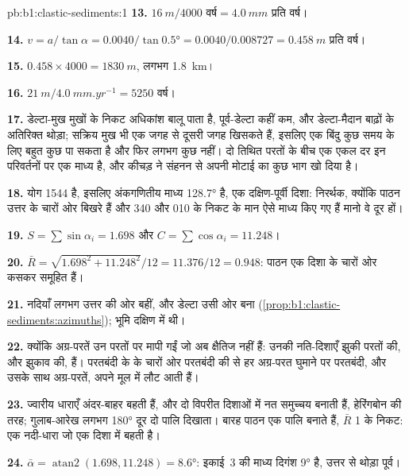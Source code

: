 \begin{solution}{pb:b1:clastic-sediments:1}
\textbf{13.} $\qty{16}{m}/\num{4000}\text{ वर्ष} = \qty{4.0}{mm}$ प्रति वर्ष।

\textbf{14.} $v = a/\tan\alpha = 0.0040/\tan\ang{0.5} = 0.0040/0.008727 =
\qty{0.458}{m}$ प्रति वर्ष।

\textbf{15.} $0.458 \times 4000 = \qty{1830}{m}$, लगभग \qty{1.8}{km}।

\textbf{16.} $\qty{21}{m}/\qty{4.0}{mm.yr^{-1}} = 5250$ वर्ष।

\textbf{17.} डेल्टा-मुख मुखों के निकट अधिकांश बालू पाता है, पूर्व-डेल्टा कहीं कम, और डेल्टा-मैदान बाढ़ों के अतिरिक्त थोड़ा; सक्रिय मुख भी एक जगह से दूसरी जगह खिसकते हैं, इसलिए एक बिंदु कुछ समय के लिए बहुत कुछ पा सकता है और फिर लगभग कुछ नहीं। दो तिथित परतों के बीच एक एकल दर इन परिवर्तनों पर एक माध्य है, और कीचड़ ने संहनन से अपनी मोटाई का कुछ भाग खो दिया है।

\textbf{18.} योग 1544 है, इसलिए अंकगणितीय माध्य \ang{128.7} है, एक दक्षिण-पूर्वी दिशा: निरर्थक, क्योंकि पाठन उत्तर के चारों ओर बिखरे हैं और 340 और 010 के निकट के मान ऐसे माध्य किए गए हैं मानो वे दूर हों।

\textbf{19.} $S = \sum\sin\alpha_i = 1.698$ और $C = \sum\cos\alpha_i =
11.248$।

\textbf{20.} $\bar R = \sqrt{1.698^2 + 11.248^2}/12 = 11.376/12 = 0.948$: पाठन एक दिशा के चारों ओर कसकर समूहित हैं।

\textbf{21.} नदियाँ लगभग उत्तर की ओर बहीं, और डेल्टा उसी ओर बना
(\cref{prop:b1:clastic-sediments:azimuths}); भूमि दक्षिण में थी।

\textbf{22.} क्योंकि अग्र-परतें उन परतों पर मापी गईं जो अब क्षैतिज नहीं हैं: उनकी नति-दिशाएँ झुकी परतों की, और झुकाव की, हैं। परतबंदी के  के चारों ओर परतबंदी की  से हर अग्र-परत घुमाने पर परतबंदी, और उसके साथ अग्र-परतें, अपने मूल  में लौट आती हैं।

\textbf{23.} ज्वारीय धाराएँ अंदर-बाहर बहती हैं, और दो विपरीत दिशाओं में नत समुच्चय बनाती हैं, हेरिंगबोन  की तरह; गुलाब-आरेख लगभग \ang{180} दूर दो पालि दिखाता। बारह पाठन एक पालि बनाते हैं, $\bar R$ 1 के निकट: एक नदी-धारा जो एक दिशा में बहती है।

\textbf{24.} $\bar\alpha = \operatorname{atan2}(1.698, 11.248) = \ang{8.6}$: इकाई~3 की माध्य  दिगंश \ang{9} है, उत्तर से थोड़ा पूर्व।
\end{solution}
